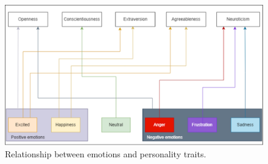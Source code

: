 %
%
\begin{figure}[h]
  \centering
  \includegraphics[width=\textwidth]{figures/emotion_traits_link.png}
  \caption{Relationship between emotions and personality traits.}
  \label{fig:emotion_traits_link}
\end{figure}
%
